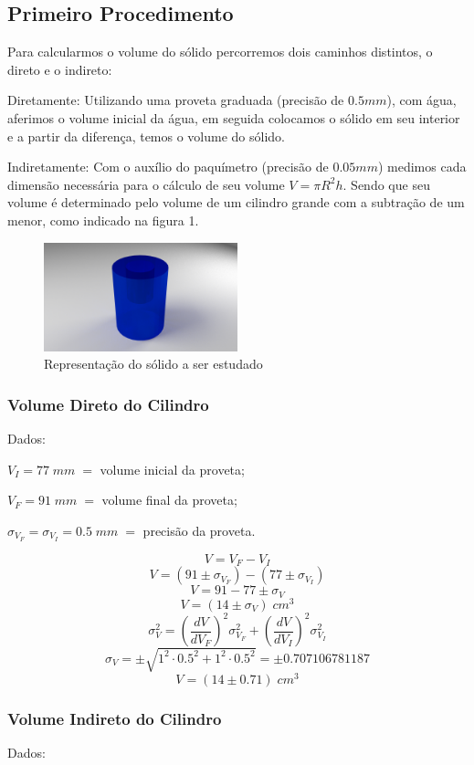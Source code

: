 \documentclass{article}
\begin{document}
\subsection{Primeiro Procedimento}
\indent

Para calcularmos o volume do sólido percorremos dois caminhos distintos, o direto e o indireto:

Diretamente: Utilizando uma proveta graduada (precisão de $0.5mm$), com água, aferimos o volume inicial da água, em seguida colocamos o sólido em seu interior e a partir da diferença, temos o volume do sólido.

Indiretamente: Com o auxílio do paquímetro (precisão de $0.05mm$) medimos cada dimensão necessária para o cálculo de seu volume $V = \pi R^2 h$. Sendo que seu volume é determinado pelo volume de um cilindro grande com a subtração de um menor, como indicado na figura 1.

\begin{figure}[h]
    \centering
    \includegraphics[width=0.5\textwidth]{a0002.png}
    \caption{Representação do sólido a ser estudado}
    \label{fig:solido}
\end{figure}


\subsubsection{Volume Direto do Cilindro}
Dados:

$V_I = 77\;mm\; =$ volume inicial da proveta;

$V_F = 91\;mm\; =$ volume final da proveta;

$\sigma_{V_F} = \sigma_{V_I} = 0.5\;mm\;=$ precisão da proveta.

\[V = V_F - V_I\]
\[V = (91 \pm \sigma_{V_F})-(77 \pm \sigma_{V_I})\]
\[V = 91-77\pm\sigma_{V}\]
\[V= (14 \pm\sigma_{V})\; cm^3\]
\[\sigma_{V}^2 = \left(\frac{dV}{dV_F}\right)^2\sigma_{V_F}^2+\left(\frac{dV}{dV_I}\right)^2\sigma_{V_I}^2\]
\[\sigma_{V} = \pm\sqrt{1^2\cdot0.5^2+1^2\cdot0.5^2}=\pm0.707106781187\]
\[V= (14 \pm0.71)\; cm^3\]


\subsubsection{Volume Indireto do Cilindro}
Dados:
\end{document}
